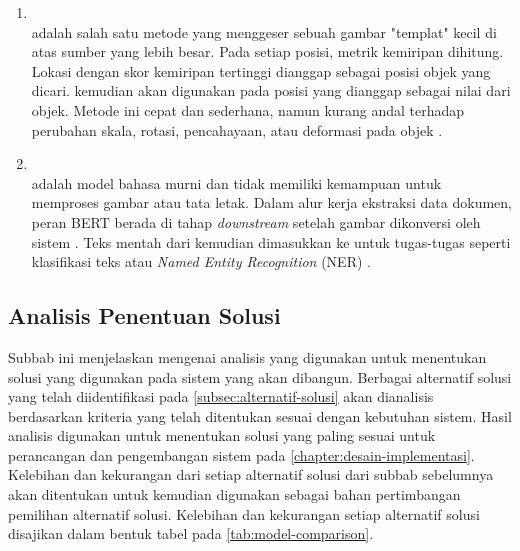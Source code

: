 \begin{enumerate}
    \item \templatematching{} ~\\ \templatematching{} adalah salah satu metode \cv{} yang menggeser sebuah gambar "templat" kecil di atas sumber yang lebih besar. Pada setiap posisi, metrik kemiripan dihitung. Lokasi dengan skor kemiripan tertinggi dianggap sebagai posisi objek yang dicari. \ocr{} kemudian akan digunakan pada posisi yang dianggap sebagai nilai dari objek. Metode ini cepat dan sederhana, namun kurang andal terhadap perubahan skala, rotasi, pencahayaan, atau deformasi pada objek \parencite{bradski2008learning}.
    \item \bert{} ~\\
    \bert{} adalah model bahasa murni dan tidak memiliki kemampuan untuk memproses gambar atau tata letak. Dalam alur kerja ekstraksi data dokumen, peran BERT berada di tahap \textit{downstream} setelah gambar dikonversi oleh sistem \ocr. Teks mentah dari \ocr{} kemudian dimasukkan ke \bert{} untuk tugas-tugas \nlp{} seperti klasifikasi teks atau \emph{Named Entity Recognition} (NER) \parencite{koroteev2021bert}. 
\end{enumerate}


\subsection{Analisis Penentuan Solusi}
\label{subsec:analisis-penentuan-solusi}

Subbab ini menjelaskan mengenai analisis yang digunakan untuk menentukan solusi yang digunakan pada sistem yang akan dibangun. Berbagai alternatif solusi yang telah diidentifikasi pada \autoref{subsec:alternatif-solusi} akan dianalisis berdasarkan kriteria yang telah ditentukan sesuai dengan kebutuhan sistem. Hasil analisis digunakan untuk menentukan solusi yang paling sesuai untuk perancangan dan pengembangan sistem pada \autoref{chapter:desain-implementasi}. Kelebihan dan kekurangan dari setiap alternatif solusi dari subbab sebelumnya akan ditentukan untuk kemudian digunakan sebagai bahan pertimbangan pemilihan alternatif solusi. Kelebihan dan kekurangan setiap alternatif solusi disajikan dalam bentuk tabel pada \autoref{tab:model-comparison}.

